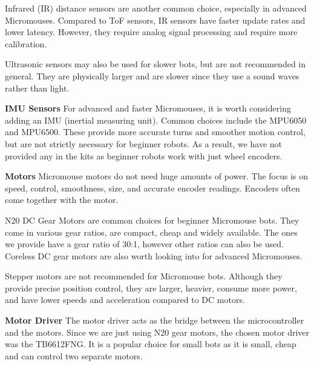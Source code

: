 \documentclass[11pt]{report}
\begin{document}
	\noindent
	Infrared (IR) distance sensors are another common choice, especially in advanced Micromouses. 
	Compared to ToF sensors, IR sensors have faster update rates and lower latency. However, they 
	require	analog signal processing and require more calibration.  
	\newline

	\noindent
	Ultrasonic sensors may also be used for slower bots, but are not recommended in general. They 
	are physically larger and are slower since they use a sound waves rather than light.
	\newline

	\noindent
	\textbf{IMU Sensors}
	\newline
	For advanced and faster Micromouses, it is worth considering adding an IMU (inertial measuring
	unit). Common choices include the MPU6050 and MPU6500. These provide more accurate turns and 
	smoother motion control, but are not strictly necessary for beginner robots. As a result, we 
	have not provided any in the kits as beginner robots work with just wheel encoders.
	\newline

	\noindent
	\textbf{Motors}
	\newline
	Micromouse motors do not need huge amounts of power. The focus is on speed, control, smoothness,
	size, and accurate encoder readings. Encoders often come together with the motor.
	\newline

	\noindent
	N20 DC Gear Motors are common choices for beginner Micromouse bots. They come in various 
	gear ratios, are compact, cheap and widely available. The ones we provide have a gear ratio of 
	30:1, however other ratios can also be used. Coreless DC gear motors are also worth looking into 
	for advanced Micromouses.
	\newline

	\noindent
	Stepper motors are not recommended for Micromouse bots. Although they provide precise position
	control, they are larger, heavier, consume more power, and have lower speeds and
	acceleration compared to DC motors.
	\newline

	\noindent 
	\textbf{Motor Driver}
	\newline
	The motor driver acts as the bridge between the microcontroller and the motors. Since we are 
	just using N20 gear motors, the chosen motor driver was the TB6612FNG. It is a popular choice 
	for small bots as it is small, cheap and can control two separate motors. 
	\newline
\end{document}
